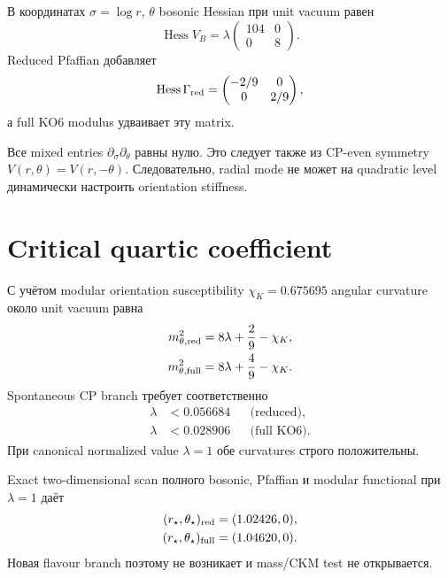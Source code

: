 В координатах \(\sigma=\log r\), \(\theta\) bosonic Hessian при unit vacuum
равен
\begin{equation}
 \operatorname{Hess} V_B
 =\lambda
 \begin{pmatrix}
 104&0\\0&8
 \end{pmatrix}.
\end{equation}
Reduced Pfaffian добавляет
\begin{equation}
 \operatorname{Hess}\Gamma_{\rm red}
 =
 \begin{pmatrix}
 -2/9&0\\0&2/9
 \end{pmatrix},
\end{equation}
а full KO6 modulus удваивает эту matrix.

\begin{theorem}
Все mixed entries \(\partial_\sigma\partial_\theta\) равны нулю. Это следует
также из CP-even symmetry \(V(r,\theta)=V(r,-\theta)\). Следовательно, radial
mode не может на quadratic level динамически настроить orientation stiffness.
\end{theorem}

\section{Critical quartic coefficient}

С учётом modular orientation susceptibility \(\chi_K=0.675695\) angular
curvature около unit vacuum равна
\begin{align}
 m_{\theta,\rm red}^2&=8\lambda+\frac29-\chi_K,\\
 m_{\theta,\rm full}^2&=8\lambda+\frac49-\chi_K.
\end{align}
Spontaneous CP branch требует соответственно
\begin{align}
 \lambda&<0.056684 &&\text{(reduced)},\\
 \lambda&<0.028906 &&\text{(full KO6)}.
\end{align}
При canonical normalized value \(\lambda=1\) обе curvatures строго
положительны.

Exact two-dimensional scan полного bosonic, Pfaffian и modular functional
при \(\lambda=1\) даёт
\begin{align}
 (r_\star,\theta_\star)_{\rm red}&=(1.02426,0),\\
 (r_\star,\theta_\star)_{\rm full}&=(1.04620,0).
\end{align}
Новая flavour branch поэтому не возникает и mass/CKM test не открывается.

